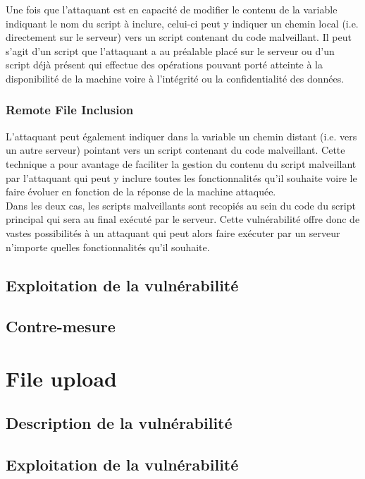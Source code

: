 Une fois que l'attaquant est en capacité de modifier le contenu de la variable indiquant le nom du script à inclure, celui-ci peut y indiquer un chemin local (i.e. directement sur le serveur) vers un script contenant du code malveillant. Il peut s'agit d'un script que l'attaquant a au préalable placé sur le serveur ou d'un script déjà présent qui effectue des opérations pouvant porté atteinte à la disponibilité de la machine voire à l'intégrité ou la confidentialité des données.

\subsubsection{Remote File Inclusion}

L'attaquant peut également indiquer dans la variable un chemin distant (i.e. vers un autre serveur) pointant vers un script contenant du code malveillant. Cette technique a pour avantage de faciliter la gestion du contenu du script malveillant par l'attaquant qui peut y inclure toutes les fonctionnalités qu'il souhaite voire le faire évoluer en fonction de la réponse de la machine attaquée.\\

Dans les deux cas, les scripts malveillants sont recopiés au sein du code du script principal qui sera au final exécuté par le serveur. Cette vulnérabilité offre donc de vastes possibilités à un attaquant qui peut alors faire exécuter par un serveur n'importe quelles fonctionnalités qu'il souhaite.

\subsection{Exploitation de la vulnérabilité}

\subsection{Contre-mesure}

\section{File upload}

\subsection{Description de la vulnérabilité}

\subsection{Exploitation de la vulnérabilité}

